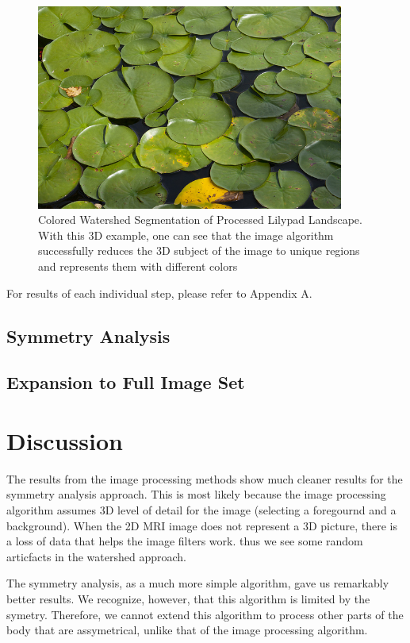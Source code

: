 \documentclass[12pt]{article}
\theoremstyle{plain}%
\theoremstyle{definition}
\theoremstyle{remark}
\begin{document}
\begin{figure}[!h]
	\centering
		\includegraphics[width=0.9\textwidth]{lilypad.jpg}
	\caption{Colored Watershed Segmentation of Processed Lilypad Landscape.  With this 3D example, one can see that the image algorithm successfully reduces the 3D subject of the image to unique regions and represents them with different colors}
\end{figure}

For results of each individual step, please refer to Appendix A.

\subsection{Symmetry Analysis}

\subsection{Expansion to Full Image Set}

\section{Discussion}

The results from the image processing methods show much cleaner results for the symmetry analysis approach.  This is most likely because the image processing algorithm assumes 3D level of detail for the image (selecting a foregournd and a background).  When the 2D MRI image does not represent a 3D picture, there is a loss of data that helps the image filters work.  thus we see some random articfacts in the watershed approach.

The symmetry analysis, as a much more simple algorithm, gave us remarkably better results.  We recognize, however, that this algorithm is limited by the symetry.  Therefore, we cannot extend this algorithm to process other parts of the body that are assymetrical, unlike that of the image processing algorithm.
\end{document}
